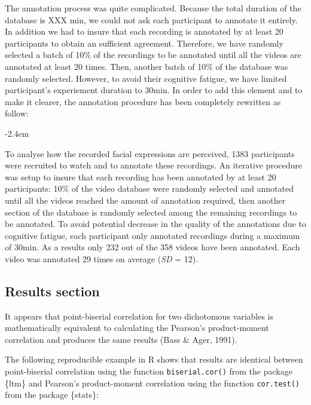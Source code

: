 \documentclass[]{article}
\renewenvironment{quote}{\begin{fquote}\advance\leftmargini -2.4em\begin{oldquote}}{\end{oldquote}\end{fquote}}
\newenvironment{fquote}
  {\def\FrameCommand{
	\fboxsep=0.6em %
	\fcolorbox{black}{white}}%
    \MakeFramed {\advance\hsize-2\width \FrameRestore}
    \begin{minipage}{\linewidth}
  }
  {\end{minipage}\endMakeFramed}
\begin{document}
The annotation process was quite complicated. Because the total duration of the database is XXX min, we could not ask each participant to annotate it entirely. In addition we had to insure that each recording is annotated by at least 20 participants to obtain an sufficient agreement. Therefore, we have randomly selected a batch of 10\% of the recordings to be annotated until all the videos are annotated at least 20 times. Then, another batch of 10\% of the database was randomly selected. However, to avoid their cognitive fatigue, we have limited participant's experiement duration to 30min. In order to add this element and to make it clearer, the annotation procedure has been completely rewritten as follow:

\begin{quote}
To analyse how the recorded facial expressions are perceived, 1383 participants were recruited to watch and to annotate these recordings. An iterative procedure was setup to insure that each recording has been annotated by at least 20 participants: 10\% of the video database were randomly selected and annotated until all the videos reached the amount of annotation required, then another section of the database is randomly selected among the remaining recordings to be annotated. To avoid potential decrease in the quality of the annotations due to cognitive fatigue, each participant only annotated recordings during a maximum of 30min. As a results only 232 out of the 358 videos have been annotated. Each video was annotated 29 times on average (\emph{SD} = 12).
\end{quote}

\hypertarget{results-section}{%
\subsection{Results section}\label{results-section}}


It appears that point-biserial correlation for two dichotomous variables is mathematically equivalent to calculating the Pearson's product-moment correlation and produces the same results (Bass \& Ager, 1991).

The following reproducible example in R shows that results are identical between point-biserial correlation using the function \texttt{biserial.cor()} from the package \{ltm\} and Pearson's product-moment correlation using the function \texttt{cor.test()} from the package \{stats\}:
\end{document}

